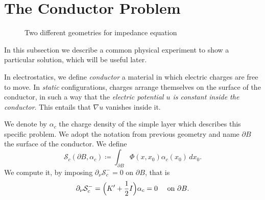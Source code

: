 \documentclass[10pt, a4paper, twoside, openright]{book}
\theoremstyle{definition}
\theoremstyle{plain}
\theoremstyle{plain}
\theoremstyle{plain}
\theoremstyle{plain}
\theoremstyle{plain}
\theoremstyle{plain}
\theoremstyle{plain}
\theoremstyle{plain}
\begin{document}
\section{The Conductor Problem}
\begin{figure}
\centering
{}
\caption{Two different geometries for impedance equation}
\label{fig:subfig}
\end{figure}
In this subsection we describe a common physical experiment to show a particular solution, which will be useful later.
\par
In electrostatics, we define \emph{conductor} a material in which electric charges are 
free to move. In \emph{static} configurations,
charges arrange themselves on the surface of the conductor, in such a way that the \emph{electric potential $u$ is constant inside the conductor}. 
This entails that $\nabla u$ vanishes inside it.
\par
We denote by $\alpha_{c}$ the charge density of the simple layer which describes this specific problem. We adopt the notation from previous geometry and name $\partial B$ the surface of the conductor.
We define
\begin{equation}
 \mathcal{S}_{c}(\partial B, \alpha_c)\coloneqq\int_{\partial B}\Phi(x,x_0)\alpha_{c}(x_0)\,dx_0.
\end{equation}
We compute it, by imposing $\partial_\nu \mathcal{S}_{c}^- = 0$ on $\partial B$, that is
\begin{equation}
 \partial_\nu\mathcal{S}_{c}^-=\Bigl(K'+\dfrac{1}{2}I\Bigr)\alpha_{c}= 0\quad\textup{ on }\partial B. \label{eq:alpha_c-equation}
\end{equation}
\end{document}
